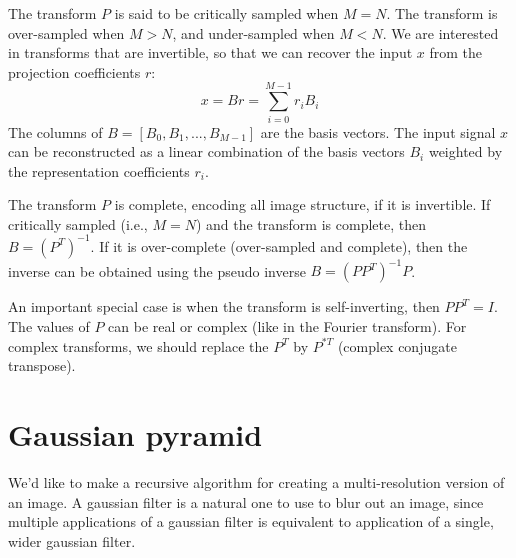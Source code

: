 The transform $P$ is said to be critically sampled when $M=N$.  The transform is over-sampled when $M > N$, and under-sampled when $M < N$. We are interested in transforms that are invertible, so that we can recover the input $x$ from the projection coefficients $r$:
\begin{equation}
	x = B r = \sum_{i=0}^{M-1} r_i B_i
\end{equation}
The columns of $B= \left[B_0,  B_1, ...,B_{M-1}\right]$ are the basis vectors. The input signal $x$ can be reconstructed as a linear combination of the basis vectors $B_i$ weighted by the representation coefficients $r_i$.

The transform $P$ is complete, encoding all image structure, if it is invertible. If critically sampled (i.e., $M=N$) and the transform is complete, then $B = (P^T)^{-1}$.  If it is over-complete (over-sampled and complete), then the inverse can be obtained using the pseudo inverse $B=(P P^T)^{-1}P$.

An important special case is when the transform is self-inverting, then $P P^{T} = I$. The values of $P$ can be real  or complex (like in the Fourier transform). For complex transforms, we should replace the $P^T$ by $P^{*T}$ (complex conjugate transpose).




\section{Gaussian pyramid}


%
%
%
%
%
%
%


We'd like to make a recursive algorithm for creating a multi-resolution version of an image.  A gaussian filter is a natural
one to use to blur out an image, since multiple applications of a gaussian filter is equivalent to application of a single, wider
gaussian filter.

